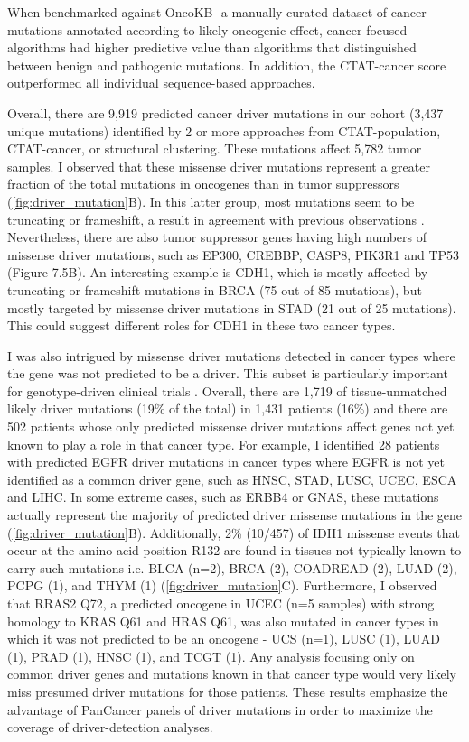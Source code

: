 When benchmarked against OncoKB \cite{RN144}-a manually curated dataset of cancer mutations annotated according to likely oncogenic effect, cancer-focused algorithms had higher predictive value than algorithms that distinguished between benign and pathogenic mutations. In addition, the CTAT-cancer score outperformed all individual sequence-based approaches. 

Overall, there are 9,919 predicted cancer driver mutations in our cohort (3,437 unique mutations) identified by 2 or more approaches from CTAT-population, CTAT-cancer, or structural clustering. These mutations affect 5,782 tumor samples. I observed that these missense driver mutations represent a greater fraction of the total mutations in oncogenes than in tumor suppressors (\autoref{fig:driver_mutation}B). In this latter group, most mutations seem to be truncating or frameshift, a result in agreement with previous observations \cite{RN185}. Nevertheless, there are also tumor suppressor genes having high numbers of missense driver mutations, such as EP300, CREBBP, CASP8, PIK3R1 and TP53 (Figure 7.5B). An interesting example is CDH1, which is mostly affected by truncating or frameshift mutations in BRCA (75 out of 85 mutations), but mostly targeted by missense driver mutations in STAD (21 out of 25 mutations). This could suggest different roles for CDH1 in these two cancer types.

I was also intrigued by missense driver mutations detected in cancer types where the gene was not predicted to be a driver. This subset is particularly important for genotype-driven clinical trials \cite{RN186}. Overall, there are 1,719 of tissue-unmatched likely driver mutations (19\% of the total) in 1,431 patients (16\%) and there are 502 patients whose only predicted missense driver mutations affect genes not yet known to play a role in that cancer type. For example, I identified 28 patients with predicted EGFR driver mutations in cancer types where EGFR is not yet identified as a common driver gene, such as HNSC, STAD, LUSC, UCEC, ESCA and LIHC. In some extreme cases, such as ERBB4 or GNAS, these mutations actually represent the majority of predicted driver missense mutations in the gene (\autoref{fig:driver_mutation}B). Additionally, 2\% (10/457) of IDH1 missense events that occur at the amino acid position R132 are found in tissues not typically known to carry such mutations i.e. BLCA (n=2), BRCA (2), COADREAD (2), LUAD (2), PCPG (1), and THYM (1) (\autoref{fig:driver_mutation}C). Furthermore, I observed that RRAS2 Q72, a predicted oncogene in UCEC (n=5 samples) with strong homology to KRAS Q61 and HRAS Q61, was also mutated in cancer types in which it was not predicted to be an oncogene - UCS (n=1), LUSC (1), LUAD (1), PRAD (1), HNSC (1), and TCGT (1). Any analysis focusing only on common driver genes and mutations known in that cancer type would very likely miss presumed driver mutations for those patients. These results emphasize the advantage of PanCancer panels of driver mutations in order to maximize the coverage of driver-detection analyses.

